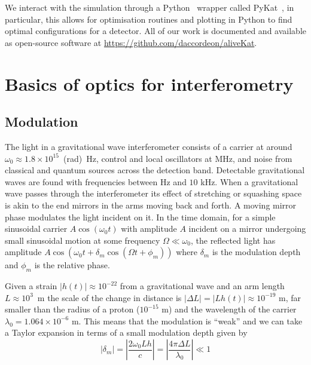 \documentclass[aps,pra,superscriptaddress,reprint,nofootinbib]{revtex4-1}
\newcommand{\abs}[1]{\left\lvert #1 \right\rvert}
\begin{document}
We interact with the simulation through a Python~\cite{python} wrapper called PyKat~\cite{brown2020pykat}, in particular, this allows for optimisation routines and plotting in Python to find optimal configurations for a detector. All of our work is documented and available as open-source software at \url{https://github.com/daccordeon/aliveKat}.


\section{Basics of optics for interferometry}
\label{sec:basics}

\subsection{Modulation}

The light in a gravitational wave interferometer consists of a carrier at around $\omega_0 \approx 1.8 \times 10^{15}$~(rad)~Hz, control and local oscillators at MHz, and noise from classical and quantum sources across the detection band. Detectable gravitational waves are found with frequencies between Hz and $10$ kHz. When a gravitational wave passes through the interferometer its effect of stretching or squashing space is akin to the end mirrors in the arms moving back and forth. A moving mirror phase modulates the light incident on it. In the time domain, for a simple sinusoidal carrier $A \cos(\omega_0 t)$ with amplitude $A$ incident on a mirror undergoing small sinusoidal motion at some frequency $\Omega \ll \omega_0$, the reflected light has amplitude $A \cos(\omega_0 t + \delta_m \cos(\Omega t + \phi_m))$ where $\delta_m$ is the modulation depth and $\phi_m$ is the relative phase.


Given a strain $\abs{h(t)} \approx 10^{-22}$ from a gravitational wave and an arm length $L \approx 10^3$~m the scale of the change in distance is $\abs{\Delta L} = \abs{L h(t)} \approx 10^{-19}$ m, far smaller than the radius of a proton ($10^{-15}$ m) and the wavelength of the carrier $\lambda_0 = 1.064 \times 10^{-6}$ m. This means that the modulation is ``weak'' and we can take a Taylor expansion in terms of a small modulation depth given by
\begin{equation}
\abs{\delta_m} = \abs{\frac{2 \omega_0 L h}{c}} = \abs{\frac{4 \pi \Delta L}{\lambda_0}} \ll 1
\end{equation}
\end{document}
